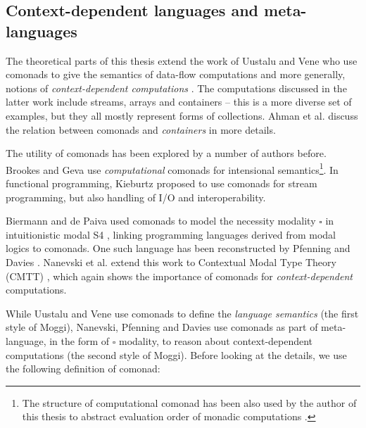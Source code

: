  
\subsection{Context-dependent languages and meta-languages}
\label{sec:path-sem-contextdep}

The theoretical parts of this thesis extend the work of Uustalu and Vene who use comonads
to give the semantics of data-flow computations \cite{comonads-dataflow} and more generally, 
notions of \emph{context-dependent computations} \cite{comonads-notions}. The computations discussed 
in the latter work include streams, arrays and containers -- this is a more diverse set of examples, 
but they all mostly represent forms of collections. Ahman et al. \cite{comonads-containers} discuss
the relation between comonads and \emph{containers} in more details.

The utility of comonads has been explored by a number of authors before. Brookes and Geva
\cite{comonads-computational} use \emph{computational} comonads for intensional semantics\footnote{The
structure of computational comonad has been also used by the author of this thesis to abstract
evaluation order of monadic computations \cite{comonads-malias}.}. In functional programming,
Kieburtz \cite{comonads-and-codata} proposed to use comonads for stream programming, but also 
handling of I/O and interoperability.

Biermann and de Paiva used comonads to model the necessity modality $\square$ in intuitionistic
modal S4 \cite{logic-intuitionistic-modal}, linking programming languages derived from modal
logics to comonads. One such language has been reconstructed by Pfenning and Davies
\cite{logic-modal-reconstruction}. Nanevski et al. extend this work to Contextual Modal Type 
Theory (CMTT) \cite{logic-cmtt}, which again shows the importance of comonads for 
\emph{context-dependent} computations.

While Uustalu and Vene use comonads to define the \emph{language semantics} (the first style
of Moggi), Nanevski, Pfenning and Davies use comonads as part of meta-language, in the form 
of $\square$ modality, to reason about context-dependent computations (the second style of 
Moggi). Before looking at the details, we use the following definition of comonad:

